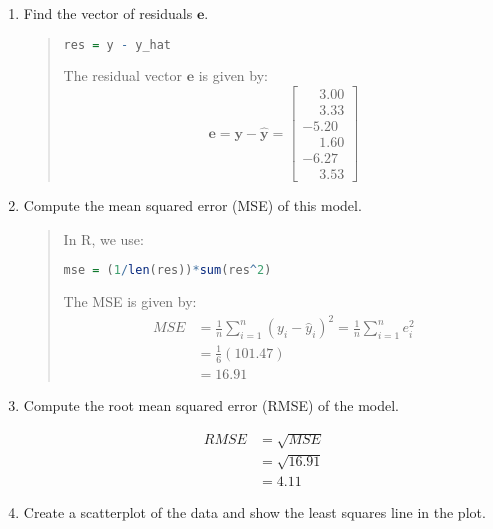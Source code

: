 \documentclass[11pt,twoside]{article}
\newcommand{\pts}[1]{\marginpar{ \small\hspace{0pt} \textit{[#1]} } }
\newcommand{\lt}{\left}
\newcommand{\rt}{\right}
\newcommand{\?}{\stackrel{?}{=}}
\newcommand{\fr}{\frac}
\newcommand{\bl}{\color{blue}}
\newenvironment{solution}{\begin{adjustwidth}{.05\textwidth}{}\bl}{\medskip\end{adjustwidth}}
\begin{document}
\begin{enumerate}[\bf (a)]
\item Find the vector of residuals $\bm e$. \pts{2pts}
  \begin{quote}
\begin{lstlisting}[language=R,basicstyle={\small\ttfamily}]
res = y - y_hat
\end{lstlisting}
    \bl The residual vector $\bm e$ is given by:
    \begin{equation*}
      \bm e = \bm y - \bm{\hat y} =
      \begin{bmatrix}
       \phantom{-}3.00 \\ \phantom{-}3.33 \\-5.20 \\ \phantom{-}1.60 \\-6.27\\\phantom{-}3.53
      \end{bmatrix}
    \end{equation*}
  \end{quote}
\item Compute the mean squared error (MSE) of this model. \pts{2pts}
  \begin{quote}
    In R, we use:
\begin{lstlisting}[language=R,basicstyle={\small\ttfamily}]
mse = (1/len(res))*sum(res^2)
\end{lstlisting}
    \bl The MSE is given by:
    \begin{align*}
      MSE &= \fr1n\sum_{i=1}^n (y_i - \hat y_i)^2  =  \fr1n\sum_{i=1}^n e_i^2\\
          &= \fr16\lt(101.47\rt)\\
          &= \boxed{16.91}
    \end{align*}
  \end{quote}

   
 
\item Compute the root mean squared error (RMSE) of the model. \pts{1}
  \begin{solution}
    \begin{align*}
      RMSE &= \sqrt{MSE} \\
           &= \sqrt{16.91}\\
      &= \boxed{4.11}
    \end{align*}
  \end{solution}

  
\item Create a scatterplot of the data and show the least squares line \pts{3} in the plot.


\end{enumerate}
\end{document}
